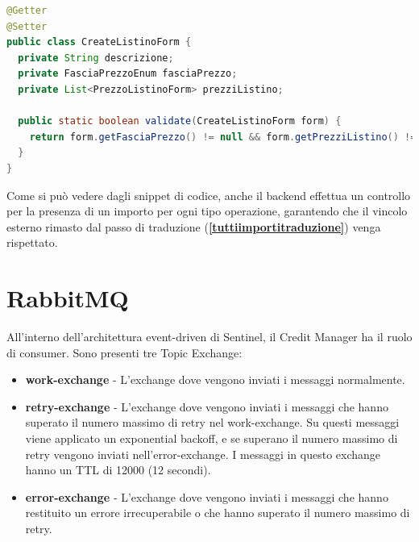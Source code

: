 \begin{lstlisting}[language=Java, breaklines=true]
@Getter
@Setter
public class CreateListinoForm {
  private String descrizione;
  private FasciaPrezzoEnum fasciaPrezzo;
  private List<PrezzoListinoForm> prezziListino;

  public static boolean validate(CreateListinoForm form) {
    return form.getFasciaPrezzo() != null && form.getPrezziListino() != null;
  }
}
\end{lstlisting}

Come si può vedere dagli snippet di codice, anche il backend effettua un controllo per la presenza di un importo per ogni tipo operazione, garantendo che il vincolo esterno rimasto
dal passo di traduzione (\textbf{\ref{tuttiimportitraduzione}}) venga rispettato.

\section{RabbitMQ}
All'interno dell'architettura event-driven di Sentinel, il Credit Manager ha il ruolo di consumer.
Sono presenti tre Topic Exchange:
\begin{itemize}
  \item \textbf{work-exchange} - L'exchange dove vengono inviati i messaggi normalmente.
  \item \textbf{retry-exchange} - L'exchange dove vengono inviati i messaggi che hanno superato il numero massimo di retry nel work-exchange.
    Su questi messaggi viene applicato un exponential backoff, e se superano il numero massimo di retry vengono inviati nell'error-exchange. I messaggi in questo
    exchange hanno un TTL di 12000 (12 secondi).
  \item \textbf{error-exchange} - L'exchange dove vengono inviati i messaggi che hanno restituito un errore irrecuperabile o che hanno superato il numero massimo di retry.
\end{itemize}

